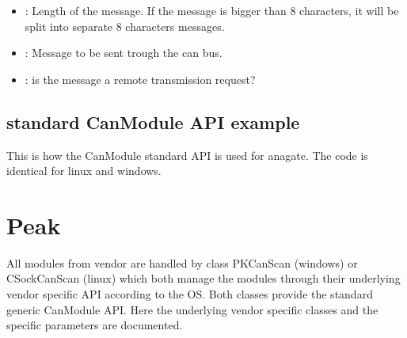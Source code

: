 \documentclass[letterpaper,10pt,english]{sphinxmanual}
\begin{document}
\begin{fulllineitems}
\begin{fulllineitems}
\begin{description}
\begin{itemize}
\item {} 
: Length of the message. If the message is bigger than 8 characters, it will be split into separate 8 characters messages. 

\item {} 
: Message to be sent trough the can bus. 

\item {} 
: is the message a remote transmission request? 

\end{itemize}

\end{description}


\end{fulllineitems}


\end{fulllineitems}



\section{standard CanModule API example}
\label{\detokenize{vendors/anagate:standard-canmodule-api-example}}
This is how the CanModule standard API is used for anagate. The code is identical for linux and windows.

\begin{sphinxVerbatim}[commandchars=\\\{\}]
    
      
  
  
\end{sphinxVerbatim}


\chapter{Peak}
\label{\detokenize{vendors/peak:peak}}\label{\detokenize{vendors/peak::doc}}
All modules from vendor {\hyperref[\detokenize{vendors/peak:peak}]{}} are handled by class PKCanScan (windows) or CSockCanScan (linux) which
both manage the modules through their underlying vendor specific API according to the OS.
Both classes provide the standard generic CanModule API.
Here the underlying vendor specific classes and the specific parameters are documented.
\end{document}
